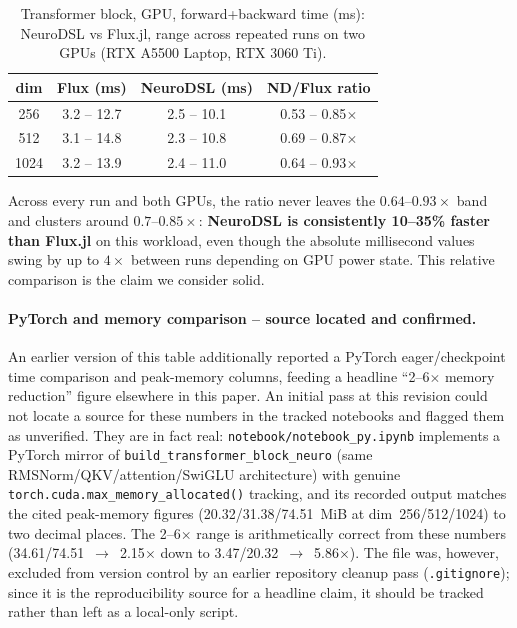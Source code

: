 \documentclass{article}
\begin{document}
\begin{table}[H]
\centering
\caption{Transformer block, GPU, forward+backward time (ms): NeuroDSL vs Flux.jl, range across repeated runs on two GPUs (RTX A5500 Laptop, RTX 3060 Ti).}
\label{tab:transformer}
\small
\setlength{\tabcolsep}{4pt}
\begin{tabular}{c c c c}
\toprule
\textbf{dim} & \textbf{Flux (ms)} & \textbf{NeuroDSL (ms)} & \textbf{ND/Flux ratio} \\
\midrule
256  & 3.2 -- 12.7 & 2.5 -- 10.1 & 0.53 -- 0.85$\times$ \\
512  & 3.1 -- 14.8 & 2.3 -- 10.8 & 0.69 -- 0.87$\times$ \\
1024 & 3.2 -- 13.9 & 2.4 -- 11.0 & 0.64 -- 0.93$\times$ \\
\bottomrule
\end{tabular}
\end{table}

Across every run and both GPUs, the ratio never leaves the $0.64$--$0.93\times$ band and clusters around $0.7$--$0.85\times$: \textbf{NeuroDSL is consistently 10--35\% faster than Flux.jl} on this workload, even though the absolute millisecond values swing by up to $4\times$ between runs depending on GPU power state. This relative comparison is the claim we consider solid.

\paragraph{PyTorch and memory comparison -- source located and confirmed.} An earlier version of this table additionally reported a PyTorch eager/checkpoint time comparison and peak-memory columns, feeding a headline ``2--6$\times$ memory reduction'' figure elsewhere in this paper. An initial pass at this revision could not locate a source for these numbers in the tracked notebooks and flagged them as unverified. They are in fact real: \texttt{notebook/notebook\_py.ipynb} implements a PyTorch mirror of \texttt{build\_transformer\_block\_neuro} (same RMSNorm/QKV/attention/SwiGLU architecture) with genuine \texttt{torch.cuda.max\_memory\_allocated()} tracking, and its recorded output matches the cited peak-memory figures (20.32/31.38/74.51~MiB at dim~256/512/1024) to two decimal places. The 2--6$\times$ range is arithmetically correct from these numbers (34.61/74.51~$\to$~2.15$\times$ down to 3.47/20.32~$\to$~5.86$\times$). The file was, however, excluded from version control by an earlier repository cleanup pass (\texttt{.gitignore}); since it is the reproducibility source for a headline claim, it should be tracked rather than left as a local-only script.
\end{document}
